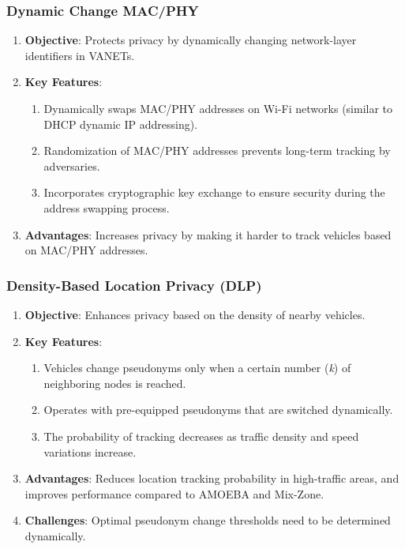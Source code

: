 \subsubsection{Dynamic Change MAC/PHY}
\begin{enumerate}
    \item \textbf{Objective}: Protects privacy by dynamically changing network-layer identifiers in VANETs.
    \item \textbf{Key Features}:
    \begin{enumerate}
        \item Dynamically swaps MAC/PHY addresses on Wi-Fi networks (similar to DHCP dynamic IP addressing).
        \item Randomization of MAC/PHY addresses prevents long-term tracking by adversaries.
        \item Incorporates cryptographic key exchange to ensure security during the address swapping process.
    \end{enumerate}
    \item \textbf{Advantages}: Increases privacy by making it harder to track vehicles based on MAC/PHY addresses.
\end{enumerate}

\subsubsection{Density-Based Location Privacy (DLP)}
\begin{enumerate}
    \item \textbf{Objective}: Enhances privacy based on the density of nearby vehicles.
    \item \textbf{Key Features}:
    \begin{enumerate}
        \item Vehicles change pseudonyms only when a certain number (\emph{k}) of neighboring nodes is reached.
        \item Operates with pre-equipped pseudonyms that are switched dynamically.
        \item The probability of tracking decreases as traffic density and speed variations increase.
    \end{enumerate}
    \item \textbf{Advantages}: Reduces location tracking probability in high-traffic areas, and improves performance compared to AMOEBA and Mix-Zone.
    \item \textbf{Challenges}: Optimal pseudonym change thresholds need to be determined dynamically.
\end{enumerate}

